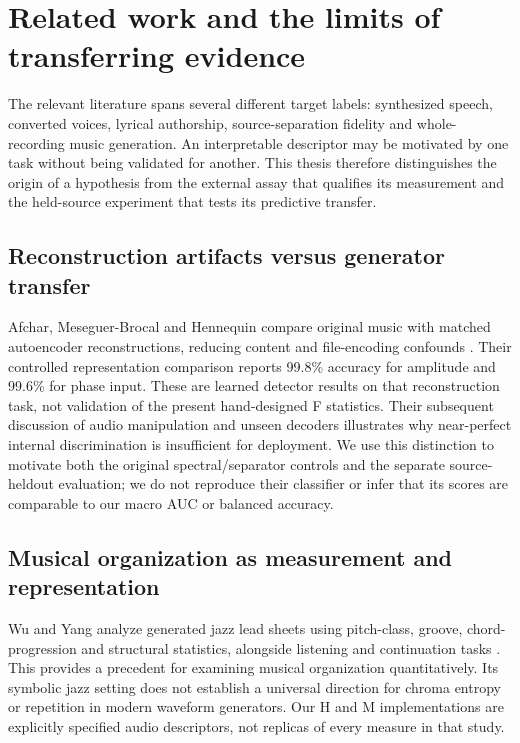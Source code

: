 \section{Related work and the limits of transferring evidence}
\label{sec:related-work}

The relevant literature spans several different target labels: synthesized
speech, converted voices, lyrical authorship, source-separation fidelity and
whole-recording music generation. An interpretable descriptor may be
motivated by one task without being validated for another. This thesis
therefore distinguishes the origin of a hypothesis from the external assay
that qualifies its measurement and the held-source experiment that tests
its predictive transfer.

\subsection{Reconstruction artifacts versus generator transfer}
Afchar, Meseguer-Brocal and Hennequin compare original music with matched
autoencoder reconstructions, reducing content and file-encoding confounds
\cite{afchar2025}. Their controlled representation comparison reports
99.8\% accuracy for amplitude and 99.6\% for phase input. These are learned
detector results on that reconstruction task, not validation of the present
hand-designed F statistics. Their subsequent discussion of audio manipulation
and unseen decoders illustrates why near-perfect internal discrimination
is insufficient for deployment. We use this distinction to motivate both
the original spectral/separator controls and the separate source-heldout
evaluation; we do not reproduce their classifier or infer that its scores
are comparable to our macro AUC or balanced accuracy.

\subsection{Musical organization as measurement and representation}
Wu and Yang analyze generated jazz lead sheets using pitch-class, groove,
chord-progression and structural statistics, alongside listening and
continuation tasks \cite{wu2020}. This provides a precedent for examining
musical organization quantitatively. Its symbolic jazz setting does not
establish a universal direction for chroma entropy or repetition in modern
waveform generators. Our H and M implementations are explicitly specified
audio descriptors, not replicas of every measure in that study.

